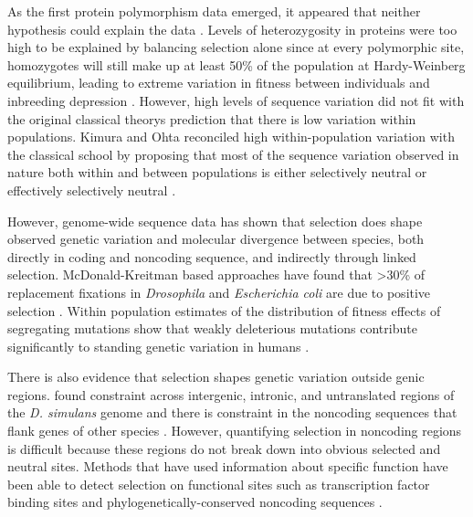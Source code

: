 As the first protein polymorphism  data emerged, it appeared that neither hypothesis could explain the data \citep{Lewontin1966-kz,Harris1966-lm}. Levels of heterozygosity in proteins were too high to be explained by balancing selection alone since at every polymorphic site, homozygotes will still make up at least 50\% of the population at Hardy-Weinberg equilibrium, leading to extreme variation in fitness between individuals and inbreeding depression \citep{lewontin1974}. However, high levels of sequence variation did not fit with the original classical theory\textsc{}s prediction that there is low variation within populations. Kimura and Ohta reconciled high within-population variation with the classical school by proposing that most of the sequence variation observed in nature both within and between populations is either selectively neutral or effectively selectively neutral \citep{Kimura1968-cl,Mootoo_Kimura1971-dc,Kimura_undated-by,Ohta1973-qx}.

However, genome-wide sequence data has shown that selection does shape observed genetic variation and molecular divergence between species, both directly in coding and noncoding sequence, and indirectly through linked selection. McDonald-Kreitman based approaches have found that \textgreater 30\% of replacement fixations in \textit{Drosophila} and \textit{Escherichia coli} are due to positive selection \citep{Eyre-Walker2006-jg,Fay2002-au,Begun2007-gh}. Within population estimates of the distribution of fitness effects of segregating mutations show that weakly deleterious mutations contribute significantly to standing genetic variation in humans \citep{Williamson2005-ja,Eyre-Walker2006-tr}. 

There is also evidence that selection shapes genetic variation outside genic regions. \citet{Begun2007-gh} found constraint across intergenic, intronic, and untranslated regions of the \textit{D. simulans} genome and there is constraint in the noncoding sequences that flank genes of other species \citep{Eory2010-ja}. However, quantifying selection in noncoding regions is difficult because these regions do not break down into obvious selected and neutral sites. Methods that have used information about specific function have been able to detect selection on functional sites such as transcription factor binding sites \citep{Arbiza2013-te} and phylogenetically-conserved noncoding sequences \citep{Halligan2013}. 

